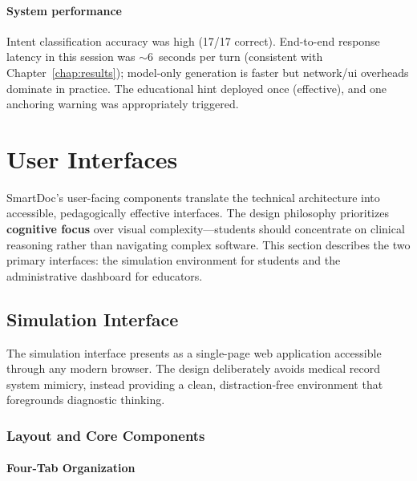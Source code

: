 \paragraph{System performance}
Intent classification accuracy was high (17/17 correct). End-to-end response latency in this session was \(\sim 6\)~seconds per turn (consistent with Chapter~\ref{chap:results}); model-only generation is faster but network/ui overheads dominate in practice. The educational hint deployed once (effective), and one anchoring warning was appropriately triggered.

\section{User Interfaces}
\label{sec:ui}

SmartDoc's user-facing components translate the technical architecture into accessible, pedagogically effective interfaces. The design philosophy prioritizes \textbf{cognitive focus} over visual complexity—students should concentrate on clinical reasoning rather than navigating complex software. This section describes the two primary interfaces: the simulation environment for students and the administrative dashboard for educators.

\subsection{Simulation Interface}
\label{subsec:ui-sim}

The simulation interface presents as a single-page web application accessible through any modern browser. The design deliberately avoids medical record system mimicry, instead providing a clean, distraction-free environment that foregrounds diagnostic thinking.

\subsubsection*{Layout and Core Components}

\paragraph{Four-Tab Organization}

